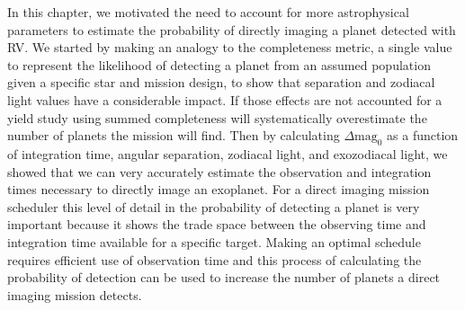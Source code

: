 In this chapter, we motivated the need to account for more astrophysical
parameters to estimate the probability of directly imaging a planet detected
with RV. We started by making an analogy to the completeness metric, a single
value to represent the likelihood of detecting a planet from an assumed
population given a specific star and mission design, to show that separation
and zodiacal light values have a considerable impact. If those effects are not
accounted for a yield study using summed completeness will systematically
overestimate the number of planets the mission will find. Then by calculating
$\Delta\textrm{mag}_0$ as a function of integration time, angular separation,
zodiacal light, and exozodiacal light, we showed that we can very accurately
estimate the observation and integration times necessary to directly image an
exoplanet. For a direct imaging mission scheduler this level of detail in the
probability of detecting a planet is very important because it shows the trade
space between the observing time and integration time available for a specific
target. Making an optimal schedule requires efficient use of observation time
and this process of calculating the probability of detection can be used to
increase the number of planets a direct imaging mission detects.

